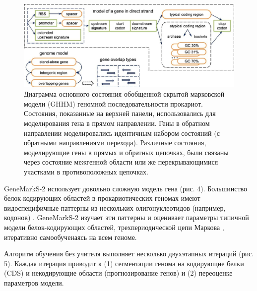 \documentclass[14pt]{extarticle}
\begin{document}
    \begin{figure}[]
            \centering
            \includegraphics[width=\textwidth]{img/gms2_1.jpg}
            \caption{Диаграмма основного состояния обобщенной скрытой марковской модели (GHHM) геномной 
            последовательности прокариот. Состояния, показанные на верхней панели, использовались для моделирования гена
            в прямом направлении. Гены в обратном направлении моделировались идентичным набором состояний (с обратными 
            направлениями перехода). Различные состояния, моделирующие гены в прямых и обратных цепочках, были связаны 
            через состояние межгенной области или же перекрывающимися участками в противоположных цепочках. 
            \cite{lomsad}}
            \label{fig:skybox}
    \end{figure}
    
    \par{GeneMarkS-2 использует довольно сложную модель гена (рис. 4). Большинство белок-кодирующих областей в 
    прокариотических геномах имеют видоспецифичные паттерны из нескольких олигонуклеотидов (например, кодонов)
    \cite{fickett}. GeneMarkS-2 изучает эти паттерны и оценивает параметры типичной модели белок-кодирующих областей, 
    трехпериодической цепи Маркова \cite{bordov2}, итеративно самообученаясь на всем геноме.}
    
    
    \par{Алгоритм обучения без учителя выполняет несколько двухэтапных итераций (рис. 5). Каждая итерация приводит к (1)
    сегментации генома на кодирующие белки (CDS) и некодирующие области (прогнозирование генов) и (2) переоценке 
    параметров модели.}
    
\end{document}
